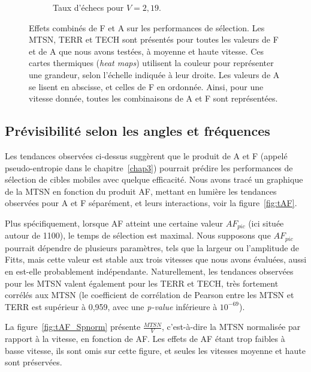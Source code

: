\begin{figure}[!htb]
\begin{subfigure}[t]{\subImgWlineplot}
			\caption{Taux d'échecs pour $V = 2,19$.}
			\label{fig:hmap_f_219}
		\end{subfigure}
		\caption[Effets combinés de F et A sur les performances de sélection]{Effets combinés de F et A sur les performances de sélection. Les MTSN, TERR et TECH sont présentés pour toutes les valeurs de F et de A que nous avons testées, à moyenne et haute vitesse. Ces cartes thermiques (\emph{heat maps}) utilisent la couleur pour représenter une grandeur, selon l'échelle indiquée à leur droite. Les valeurs de A se lisent en abscisse, et celles de F en ordonnée. Ainsi, pour une vitesse donnée, toutes les combinaisons de A et F sont représentées.}
		\label{fig:hmaps}
	\end{figure}

	\subsection{Prévisibilité selon les angles et fréquences}
	Les tendances observées ci-dessus suggèrent que le produit de A et F (appelé pseudo-entropie dans le chapitre~\ref{chap3}) pourrait prédire les performances de sélection de cibles mobiles avec quelque efficacité. Nous avons tracé un graphique de la MTSN en fonction du produit AF, mettant en lumière les tendances observées pour A et F séparément, et leurs interactions, voir la figure~\ref{fig:tAF}.
	
	Plus spécifiquement, lorsque AF atteint une certaine valeur $AF_{pic}$ (ici située autour de 1100), le temps de sélection est maximal. Nous supposons que $AF_{pic}$ pourrait dépendre de plusieurs paramètres, tels que la largeur ou l'amplitude de Fitts, mais cette valeur est stable aux trois vitesses que nous avons évaluées, aussi en est-elle probablement indépendante. Naturellement, les tendances observées pour les MTSN valent également pour les TERR et TECH, très fortement corrélés aux MTSN (le coefficient de corrélation de Pearson entre les MTSN et TERR est supérieur à 0,959, avec une \emph{p-value} inférieure à $10^{-69}$).
	
	La figure~\ref{fig:tAF_Spnorm} présente $\frac{MTSN}{V}$, c'est-à-dire la MTSN normalisée par rapport à la vitesse, en fonction de AF. Les effets de AF étant trop faibles à basse vitesse, ils sont omis sur cette figure, et seules les vitesses moyenne et haute sont préservées.
	

